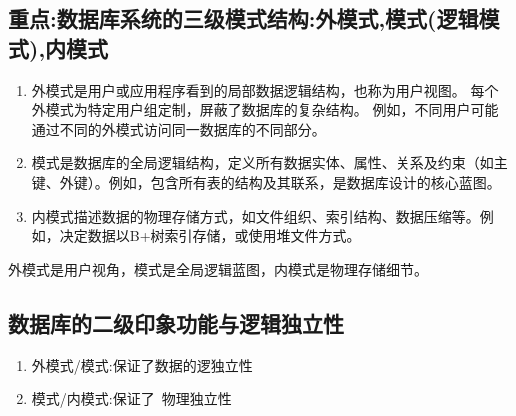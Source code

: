 \subsection{\texorpdfstring{\color{red}\textbf{重点:数据库系统的三级模式结构:外模式,模式(逻辑模式),内模式}}{重点:数据库系统的三级模式结构:外模式,模式(逻辑模式),内模式}}
\begin{enumerate}
    \item 外模式是用户或应用程序看到的局部数据逻辑结构，也称为用户视图。
    每个外模式为特定用户组定制，屏蔽了数据库的复杂结构。
    例如，不同用户可能通过不同的外模式访问同一数据库的不同部分。
    \item 模式是数据库的全局逻辑结构，定义所有数据实体、属性、关系及约束（如主键、外键）。例如，包含所有表的结构及其联系，是数据库设计的核心蓝图。
    \item 内模式描述数据的物理存储方式，如文件组织、索引结构、数据压缩等。例如，决定数据以B+树索引存储，或使用堆文件方式。
\end{enumerate}
外模式是用户视角，模式是全局逻辑蓝图，内模式是物理存储细节。
\subsection{数据库的二级印象功能与逻辑独立性}
\begin{enumerate}
    \item 外模式/模式:保证了数据的逻独立性
    \item 模式/内模式:保证了~物理独立性
\end{enumerate}
